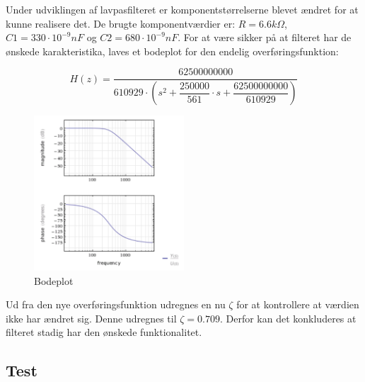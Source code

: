 Under udviklingen af lavpasfilteret er komponentstørrelserne blevet ændret for at kunne realisere det. De brugte komponentværdier er: $ R= 6.6 k\Omega $, $ C1= 330\cdot 10 ^{-9} nF$ og $ C2= 680\cdot 10^{-9} nF$.   
For at være sikker på at filteret har de ønskede karakteristika, laves et bodeplot for den endelig overføringsfunktion: 
\begin{ceqn}
\begin{equation}
H(z)=\dfrac{62500000000}{610929\cdot \left( s^2+\dfrac{250000}{561}\cdot s + \dfrac{62500000000}{610929} \right)}
\end{equation}
\end{ceqn}
\begin{figure}[H]
	\centering
	\includegraphics[width=0.5\textwidth]{Figurer/Bodeplot}
	\caption{Bodeplot}
	\label{fig:bodeplot}
\end{figure}
Ud fra den nye overføringsfunktion udregnes en nu $ \zeta $ for at kontrollere at værdien ikke har ændret sig. Denne udregnes til $ \zeta = 0.709 $. Derfor kan det konkluderes at filteret stadig har den ønskede funktionalitet. 

\subsection{Test}
